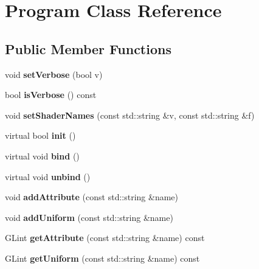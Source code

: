 \hypertarget{class_program}{}\section{Program Class Reference}
\label{class_program}
\subsection*{Public Member Functions}
\begin{DoxyCompactItemize}
\item 
\hypertarget{class_program_a47acdaa43abe9ded0f559fcbc21f920e}{}void {\bfseries set\+Verbose} (bool v)\label{class_program_a47acdaa43abe9ded0f559fcbc21f920e}

\item 
\hypertarget{class_program_acf861abf783afc75d060d2e4d0fdce1f}{}bool {\bfseries is\+Verbose} () const \label{class_program_acf861abf783afc75d060d2e4d0fdce1f}

\item 
\hypertarget{class_program_ab6cb6a62d1ec1f3ac20ddb51e34d9fa4}{}void {\bfseries set\+Shader\+Names} (const std\+::string \&v, const std\+::string \&f)\label{class_program_ab6cb6a62d1ec1f3ac20ddb51e34d9fa4}

\item 
\hypertarget{class_program_af90b1259f253f244467ab8ad486a27c6}{}virtual bool {\bfseries init} ()\label{class_program_af90b1259f253f244467ab8ad486a27c6}

\item 
\hypertarget{class_program_a986521e327d7104bd7da6cd548851c60}{}virtual void {\bfseries bind} ()\label{class_program_a986521e327d7104bd7da6cd548851c60}

\item 
\hypertarget{class_program_af3cd03e5dce1d3fc89ed503a6b14d14d}{}virtual void {\bfseries unbind} ()\label{class_program_af3cd03e5dce1d3fc89ed503a6b14d14d}

\item 
\hypertarget{class_program_abb3e81635762b20460feec16f099e8b1}{}void {\bfseries add\+Attribute} (const std\+::string \&name)\label{class_program_abb3e81635762b20460feec16f099e8b1}

\item 
\hypertarget{class_program_ad64c75754bd28ff4be18fd821bc68487}{}void {\bfseries add\+Uniform} (const std\+::string \&name)\label{class_program_ad64c75754bd28ff4be18fd821bc68487}

\item 
\hypertarget{class_program_a8a897ece6f961a45661173aeb830f23f}{}G\+Lint {\bfseries get\+Attribute} (const std\+::string \&name) const \label{class_program_a8a897ece6f961a45661173aeb830f23f}

\item 
\hypertarget{class_program_a293e8e5c5c851c3ac73f9516b49ca6af}{}G\+Lint {\bfseries get\+Uniform} (const std\+::string \&name) const \label{class_program_a293e8e5c5c851c3ac73f9516b49ca6af}

\end{DoxyCompactItemize}
